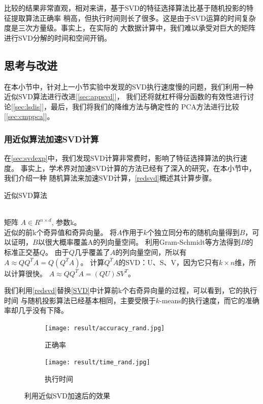 \documentclass{ctexart}
\begin{document}
        比较的结果非常直观，相对来讲，基于SVD的特征选择算法比基于随机投影的特征提取算法正确率
        稍高，但执行时间则长了很多。这是由于SVD运算的时间复杂度是三次方量级。事实上，在实际的
        大数据计算中，我们难以承受对巨大的矩阵进行SVD分解的时间和空间开销\cite{blum2020foundations,halko2011finding,halko2011finding}。

    \subsection{思考与改进}
    在本小节中，针对上一小节实验中发现的SVD执行速度慢的问题，我们利用一种近似SVD算法进行改进[\autoref{sec:appsvd}]，
    我们还将就杠杆得分函数的有效性进行讨论[\autoref{sec:lsdis}]，最后，我们将我们的降维方法与确定性的
    PCA方法进行比较[\autoref{sec:cmppca}]。

    \subsubsection{用近似算法加速SVD计算}
    \label{sec:appsvd}
    在\autoref{sec:svdexp}中，我们发现SVD计算非常费时，影响了特征选择算法的执行速度。
    事实上，学术界对加速SVD计算的方法已经有了深入的研究\cite{halko2011finding}，在本小节中，我们介绍一种
    随机算法来加速SVD计算\cite{szlam2014implementation}，\autoref{redsvd}概述其计算步骤。
    \begin{algorithm}[h]
    \caption{近似SVD算法}
    \label{redsvd}
        \begin{algorithmic}[1] %
        \REQUIRE ~~\\ %
            矩阵 $ A \in R^{n \times d}$, 参数k。
        \ENSURE ~~\\ %
            近似的前k个奇异值和奇异向量。
        \STATE 将$A$作用于$k$个独立同分布的随机向量得到$B$，可以证明，$B$以很大概率覆盖A的列向量空间\cite{halko2011finding}。
        \STATE 利用Gram-Schmidt等方法得到$B$的标准正交基$Q$。
        \STATE 由于$Q$几乎覆盖了$A$的列向量空间，所以有$A \approx Q Q^T A = Q (Q^T A)$。
        \STATE 计算$Q^T A$的SVD：U、S、V，因为它只有$k \times n$维，所以计算很快。
        \STATE $A \approx Q Q^T A = (QU) S V^T$。
        \end{algorithmic}
    \end{algorithm}

    我们利用\autoref{redsvd}替换\autoref{SVD}中计算前k个右奇异向量的过程，可以看到，它的执行时间
    与随机投影算法已经基本相同，主要受限于$k$-means的执行速度，而它的准确率却几乎没有下降。
    \begin{figure}[H]
        \centering
        \begin{subfigure}{.5\textwidth}
            \centering
            \texttt{[image: result/accuracy\_rand.jpg]}
            \caption{正确率}
        \end{subfigure}%
        \begin{subfigure}{.5\textwidth}
            \centering
            \texttt{[image: result/time\_rand.jpg]}
            \caption{执行时间}
        \end{subfigure}
        \caption{利用近似SVD加速后的效果}
        \label{fig:3cmp}
    \end{figure}
\end{document}
